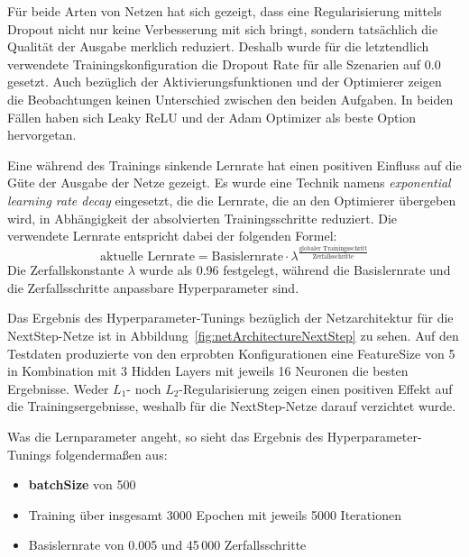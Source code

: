 Für beide Arten von Netzen hat sich gezeigt, dass eine Regularisierung mittels Dropout nicht nur keine Verbesserung mit sich bringt, sondern tatsächlich die Qualität der Ausgabe merklich reduziert.
Deshalb wurde für die letztendlich verwendete Trainingskonfiguration die Dropout Rate für alle Szenarien auf 0.0 gesetzt. 
Auch bezüglich der Aktivierungsfunktionen und der Optimierer  zeigen die Beobachtungen keinen Unterschied zwischen den beiden Aufgaben. %
In beiden Fällen haben sich Leaky ReLU und der Adam Optimizer als beste Option hervorgetan.

Eine während des Trainings sinkende Lernrate hat einen positiven Einfluss auf die Güte der Ausgabe der Netze gezeigt. 
Es wurde eine Technik namens \textit{exponential learning rate decay} eingesetzt,
die die Lernrate, die an den Optimierer übergeben wird, in Abhängigkeit der absolvierten Trainingsschritte reduziert.   
Die verwendete Lernrate entspricht dabei der folgenden Formel:
\begin{equation*}
	\text{aktuelle Lernrate} = \text{Basislernrate} \cdot \lambda ^{\frac{\text{globaler Trainingsschritt}}{\text{Zerfallsschritte}}}
\end{equation*}
Die Zerfallskonstante \(\lambda\) wurde als 0.96 festgelegt, während die Basislernrate und die Zerfallsschritte anpassbare Hyperparameter sind.


Das Ergebnis des Hyperparameter-Tunings bezüglich der Netzarchitektur für die NextStep-Netze ist in Abbildung~\ref{fig:netArchitectureNextStep} zu sehen.
Auf den Testdaten produzierte von den erprobten Konfigurationen eine FeatureSize von 5 in Kombination mit 3 Hidden Layers mit jeweils 16 Neuronen die besten Ergebnisse.
Weder \(L_1\)- noch \(L_2\)-Regularisierung zeigen einen positiven Effekt auf die Trainingsergebnisse, weshalb für die NextStep-Netze darauf verzichtet wurde.

Was die Lernparameter angeht, so sieht das Ergebnis des Hyperparameter-Tunings folgendermaßen aus:
\begin{itemize}
    \item {\sffamily \textbf{batchSize}} von 500
    \item Training über insgesamt 3000 Epochen mit jeweils 5000 Iterationen
    \item Basislernrate von 0.005 und 45\,000 Zerfallsschritte
\end{itemize}


